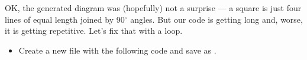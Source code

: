 \documentclass{coderdojo}
\begin{document}

OK, the generated diagram was (hopefully) not a surprise --- a square is just four lines of equal length joined by 90$^\circ$ angles. But our code is getting long and, worse, it is getting repetitive. Let's fix that with a  loop.

\begin{itemize}
\item[\todoSymbol] \color{todo}
Create a new file with the following code and save as .
\end{itemize}

\end{document}
